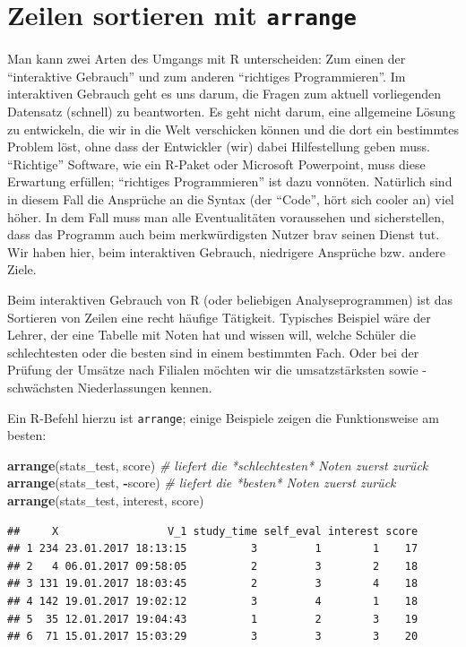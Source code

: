 \documentclass[12pt,ngerman,paper=a4,pagesize,DIV=13]{scrreprt}
\newenvironment{Shaded}{\begin{snugshade}}{\end{snugshade}}
\newcommand{\CommentTok}[1]{\textcolor[rgb]{0.56,0.35,0.01}{\textit{#1}}}
\newcommand{\KeywordTok}[1]{\textcolor[rgb]{0.13,0.29,0.53}{\textbf{#1}}}
\newcommand{\NormalTok}[1]{#1}
\newcommand{\OperatorTok}[1]{\textcolor[rgb]{0.81,0.36,0.00}{\textbf{#1}}}
\begin{document}
\hypertarget{zeilen-sortieren-mit-arrange}{%
\section{\texorpdfstring{Zeilen sortieren mit
\texttt{arrange}}{Zeilen sortieren mit arrange}}\label{zeilen-sortieren-mit-arrange}}

Man kann zwei Arten des Umgangs mit R unterscheiden: Zum einen der
\enquote{interaktive Gebrauch} und zum anderen \enquote{richtiges
Programmieren}. Im interaktiven Gebrauch geht es uns darum, die Fragen
zum aktuell vorliegenden Datensatz (schnell) zu beantworten. Es geht
nicht darum, eine allgemeine Lösung zu entwickeln, die wir in die Welt
verschicken können und die dort ein bestimmtes Problem löst, ohne dass
der Entwickler (wir) dabei Hilfestellung geben muss. \enquote{Richtige}
Software, wie ein R-Paket oder Microsoft Powerpoint, muss diese
Erwartung erfüllen; \enquote{richtiges Programmieren} ist dazu vonnöten.
Natürlich sind in diesem Fall die Ansprüche an die Syntax (der
\enquote{Code}, hört sich cooler an) viel höher. In dem Fall muss man
alle Eventualitäten voraussehen und sicherstellen, dass das Programm
auch beim merkwürdigsten Nutzer brav seinen Dienst tut. Wir haben hier,
beim interaktiven Gebrauch, niedrigere Ansprüche bzw. andere Ziele.

Beim interaktiven Gebrauch von R (oder beliebigen Analyseprogrammen) ist
das Sortieren von Zeilen eine recht häufige Tätigkeit. Typisches
Beispiel wäre der Lehrer, der eine Tabelle mit Noten hat und wissen
will, welche Schüler die schlechtesten oder die besten sind in einem
bestimmten Fach. Oder bei der Prüfung der Umsätze nach Filialen möchten
wir die umsatzstärksten sowie -schwächsten Niederlassungen kennen.

Ein R-Befehl hierzu ist \texttt{arrange}; einige Beispiele zeigen die
Funktionsweise am besten:

\begin{Shaded}
\begin{Highlighting}[]
\KeywordTok{arrange}\NormalTok{(stats_test, score) }\CommentTok{# liefert die *schlechtesten* Noten zuerst zurück}
\KeywordTok{arrange}\NormalTok{(stats_test, }\OperatorTok{-}\NormalTok{score) }\CommentTok{# liefert die *besten* Noten zuerst zurück}
\KeywordTok{arrange}\NormalTok{(stats_test, interest, score)}
\end{Highlighting}
\end{Shaded}

\begin{verbatim}
##     X                 V_1 study_time self_eval interest score
## 1 234 23.01.2017 18:13:15          3         1        1    17
## 2   4 06.01.2017 09:58:05          2         3        2    18
## 3 131 19.01.2017 18:03:45          2         3        4    18
## 4 142 19.01.2017 19:02:12          3         4        1    18
## 5  35 12.01.2017 19:04:43          1         2        3    19
## 6  71 15.01.2017 15:03:29          3         3        3    20
\end{verbatim}
\end{document}
